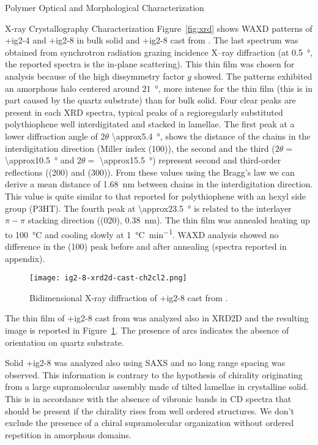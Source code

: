 \begin{section}{Polymer Optical and Morphological Characterization}
\begin{subsection}{X-ray Crystallography Characterization}
Figure~\ref{fig:xrd} shows \gls{WAXD} patterns of \cmpd+{ig2-4} and \cmpd+{ig2-8} in bulk solid and \cmpd+{ig2-8} cast from . The last spectrum was obtained from synchrotron radiation grazing incidence X--ray diffraction (at \SI{0.5}{\degree}, the reported spectra is the in-plane scattering). This thin film was chosen for analysis because of the high dissymmetry factor $g$ showed. The patterns exhibited an amorphous halo centered around \SI{21}{\degree}, more intense for the thin film (this is in part caused by the quartz substrate) than for bulk solid. 
Four clear peaks are present in each \gls{XRD} spectra, typical peaks of a regioregularly substituted poly\-thio\-phene well interdigitated and stacked in lamellae. The first peak at a lower diffraction angle of $2\theta$ \SI{\approx5.4}{\degree}, shows the distance of the chains in the interdigitation direction (Miller index (100)), the second and the third ($2\theta =$ \SI{\approx10.5}{\degree} and $2\theta =$ \SI{\approx15.5}{\degree}) represent second and third-order reflections ((200) and (300)). 
From these values using the Bragg's law we can derive a mean distance of \SI{1.68}{\nm} between chains in the interdigitation direction. This value is quite similar to that reported for poly\-thio\-phene with an hexyl side group (\gls{P3HT}). 
The fourth peak at \SI{\approx23.5}{\degree} is related to the inter\-layer $\pi-\pi$ stacking direction ((020), \SI{0.38}{\nm}). 
The thin film was annealed heating up to \SI{100}{\celsius} and cooling slowly at \SI{1}{\celsius\per\minute}. \Gls{WAXD} analysis showed no difference in the (100) peak before and after annealing (spectra reported in appendix). 

\begin{figure}[tbp]%
\centering
\texttt{[image: ig2-8-xrd2d-cast-ch2cl2.png]}
\caption{Bidimensional X-ray diffraction of \cmpd+{ig2-8} cast from .}
\label{fig:ig2-8-xrd2d-cast-ch2cl2}
\end{figure}

The thin film of \cmpd+{ig2-8} cast from  was analyzed also in \gls{XRD2D} and the resulting image is reported in Figure~\ref{fig:ig2-8-xrd2d-cast-ch2cl2}. The presence of arcs indicates the absence of orientation on quartz substrate. 

Solid \cmpd+{ig2-8} was analyzed also using \gls{SAXS} and no long range spacing was observed. This information is contrary to the hypothesis of chirality originating from a large supramolecular assembly made of tilted lamellae in crystalline solid. This is in accordance with the absence of vibronic bands in \gls{CD} spectra that should be present if the chirality rises from well ordered structures. We don't exclude the presence of a chiral supramolecular organization without ordered repetition in amorphous domains. 


\end{subsection}
\end{section}
